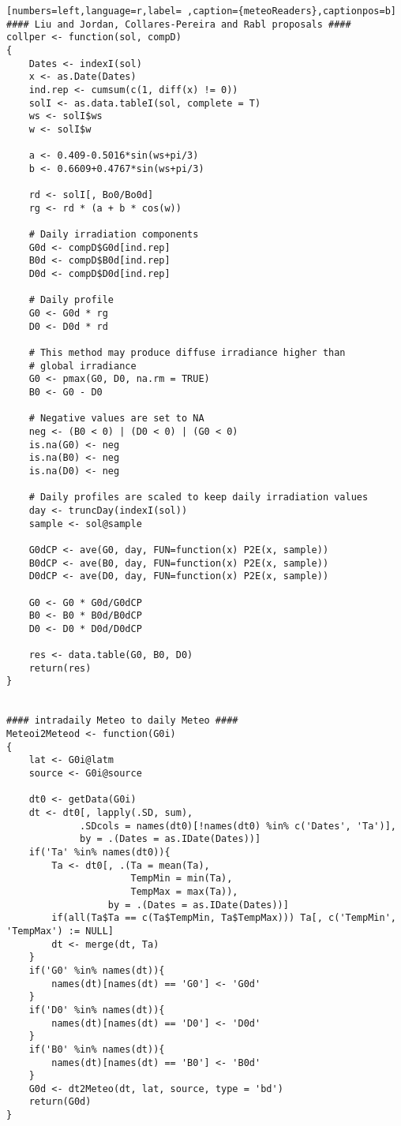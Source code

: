 \begin{lstlisting}[numbers=left,language=r,label= ,caption={meteoReaders},captionpos=b]
#### Liu and Jordan, Collares-Pereira and Rabl proposals ####
collper <- function(sol, compD)
{
    Dates <- indexI(sol)
    x <- as.Date(Dates)
    ind.rep <- cumsum(c(1, diff(x) != 0))
    solI <- as.data.tableI(sol, complete = T)
    ws <- solI$ws
    w <- solI$w

    a <- 0.409-0.5016*sin(ws+pi/3)
    b <- 0.6609+0.4767*sin(ws+pi/3)

    rd <- solI[, Bo0/Bo0d]
    rg <- rd * (a + b * cos(w))

    # Daily irradiation components
    G0d <- compD$G0d[ind.rep]
    B0d <- compD$B0d[ind.rep]
    D0d <- compD$D0d[ind.rep]

    # Daily profile
    G0 <- G0d * rg
    D0 <- D0d * rd

    # This method may produce diffuse irradiance higher than
    # global irradiance
    G0 <- pmax(G0, D0, na.rm = TRUE)
    B0 <- G0 - D0

    # Negative values are set to NA
    neg <- (B0 < 0) | (D0 < 0) | (G0 < 0)
    is.na(G0) <- neg
    is.na(B0) <- neg
    is.na(D0) <- neg

    # Daily profiles are scaled to keep daily irradiation values
    day <- truncDay(indexI(sol))
    sample <- sol@sample

    G0dCP <- ave(G0, day, FUN=function(x) P2E(x, sample))
    B0dCP <- ave(B0, day, FUN=function(x) P2E(x, sample))
    D0dCP <- ave(D0, day, FUN=function(x) P2E(x, sample))

    G0 <- G0 * G0d/G0dCP
    B0 <- B0 * B0d/B0dCP
    D0 <- D0 * D0d/D0dCP

    res <- data.table(G0, B0, D0)
    return(res)
}


#### intradaily Meteo to daily Meteo ####
Meteoi2Meteod <- function(G0i)
{
    lat <- G0i@latm
    source <- G0i@source

    dt0 <- getData(G0i)
    dt <- dt0[, lapply(.SD, sum), 
             .SDcols = names(dt0)[!names(dt0) %in% c('Dates', 'Ta')],
             by = .(Dates = as.IDate(Dates))]
    if('Ta' %in% names(dt0)){
        Ta <- dt0[, .(Ta = mean(Ta),
                      TempMin = min(Ta),
                      TempMax = max(Ta)),
                  by = .(Dates = as.IDate(Dates))]
        if(all(Ta$Ta == c(Ta$TempMin, Ta$TempMax))) Ta[, c('TempMin', 'TempMax') := NULL]
        dt <- merge(dt, Ta)
    }
    if('G0' %in% names(dt)){
        names(dt)[names(dt) == 'G0'] <- 'G0d'
    }
    if('D0' %in% names(dt)){
        names(dt)[names(dt) == 'D0'] <- 'D0d'
    }
    if('B0' %in% names(dt)){
        names(dt)[names(dt) == 'B0'] <- 'B0d'
    }
    G0d <- dt2Meteo(dt, lat, source, type = 'bd')
    return(G0d)
}


\end{lstlisting}
